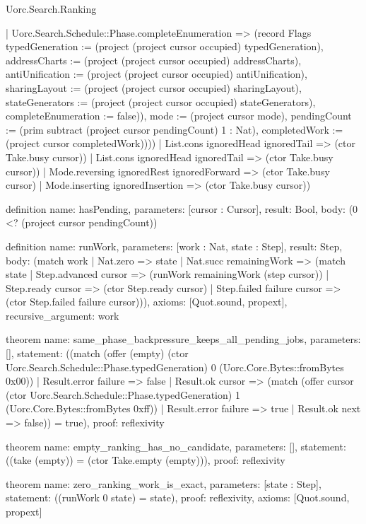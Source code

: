 \begin{lexlean}{Uorc.Search.Ranking}
\begin{semanticmodule}
{{            | Uorc.Search.Schedule::Phase.completeEnumeration => (record Flags {typedGeneration := (project (project cursor occupied) typedGeneration), addressCharts := (project (project cursor occupied) addressCharts), antiUnification := (project (project cursor occupied) antiUnification), sharingLayout := (project (project cursor occupied) sharingLayout), stateGenerators := (project (project cursor occupied) stateGenerators), completeEnumeration := false})), mode := (project cursor mode), pendingCount := (prim subtract (project cursor pendingCount) 1 : Nat), completedWork := (project cursor completedWork)})))
        | List.cons ignoredHead ignoredTail => (ctor Take.busy cursor))
      | List.cons ignoredHead ignoredTail => (ctor Take.busy cursor))
    | Mode.reversing ignoredRest ignoredForward => (ctor Take.busy cursor)
    | Mode.inserting ignoredInsertion => (ctor Take.busy cursor))
}

definition{
  name: hasPending,
  parameters: [cursor : Cursor],
  result: Bool,
  body: (0 <? (project cursor pendingCount))
}

definition{
  name: runWork,
  parameters: [work : Nat, state : Step],
  result: Step,
  body: (match work
    | Nat.zero => state
    | Nat.succ remainingWork => (match state
      | Step.advanced cursor => (runWork remainingWork (step cursor))
      | Step.ready cursor => (ctor Step.ready cursor)
      | Step.failed failure cursor => (ctor Step.failed failure cursor))),
  axioms: [Quot.sound, propext],
  recursive_argument: work
}

theorem{
  name: same_phase_backpressure_keeps_all_pending_jobs,
  parameters: [],
  statement: ((match (offer (empty) (ctor Uorc.Search.Schedule::Phase.typedGeneration) 0 (Uorc.Core.Bytes::fromBytes 0x00))
    | Result.error failure => false
    | Result.ok cursor => (match (offer cursor (ctor Uorc.Search.Schedule::Phase.typedGeneration) 1 (Uorc.Core.Bytes::fromBytes 0xff))
      | Result.error failure => true
      | Result.ok next => false)) = true),
  proof: reflexivity{}
}

theorem{
  name: empty_ranking_has_no_candidate,
  parameters: [],
  statement: ((take (empty)) = (ctor Take.empty (empty))),
  proof: reflexivity{}
}

theorem{
  name: zero_ranking_work_is_exact,
  parameters: [state : Step],
  statement: ((runWork 0 state) = state),
  proof: reflexivity{},
  axioms: [Quot.sound, propext]
}
\end{semanticmodule}
\end{lexlean}
